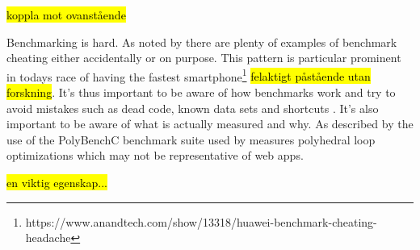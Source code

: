 
\hl{koppla mot ovanstående}

Benchmarking is hard. As noted by \textcite{CaiNerurkarWu1998} there are plenty of examples of benchmark cheating either accidentally or on purpose. This pattern is particular prominent in todays race of having the fastest smartphone\footnote{https://www.anandtech.com/show/13318/huawei-benchmark-cheating-headache} \hl{felaktigt påstående utan forskning}. It's thus important to be aware of how benchmarks work and try to avoid mistakes such as dead code, known data sets and shortcuts \parencite{CaiNerurkarWu1998}. It's also important to be aware of what is actually measured and why. As described by \textcite{JangdaPowersGuhaBerger2019} the use of the PolyBenchC benchmark suite used by \textcite{HaasRossbergSchuffTitzerHolmanGohmanWagnerZakaiBastien2017} measures polyhedral loop optimizations which may not be representative of web apps.

\hl{en viktig egenskap...}

















